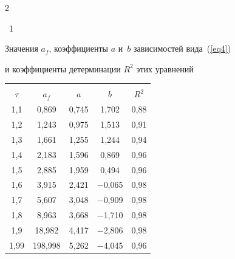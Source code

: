 \begin{multicols}{2}
\begin{center}
\vspace*{6pt}



\noindent

\parbox{64mm}{{{\tablename~1}\ \ \small{Значения $a_f$, коэффициенты $a$ и~$b$ зависимостей вида~(\ref{eq4})

и коэффициенты детерминации $R^2$ этих уравнений

}}}





\vspace*{6pt}





{\small 

\begin{tabular}{|c|c|c|c|c|}

\hline

&&&&\\[-10pt]

$\tau$ & $a_f$ & $a$ & $b$ & $R^2$ \\ 

\hline

1,1 & 0,869 &   0,745 & \hphantom{$-$}1,702 & 0,88 \\

1,2 & 1,243 &   0,975 & \hphantom{$-$}1,513 & 0,91 \\

1,3 & 1,661 &   1,255 & \hphantom{$-$}1,244 & 0,94 \\

1,4 & 2,183 &   1,596 & \hphantom{$-$}0,869 & 0,96 \\

1,5 & 2,885 &   1,959 & \hphantom{$-$}0,494 & 0,96 \\

1,6 & 3,915 &   2,421 & $-$0,065 & 0,98 \\

1,7 & 5,607 &   3,048 & $-$0,909 & 0,98 \\

1,8 & 8,963 &   3,668 & $-$1,710 & 0,98 \\

1,9 & 18,982\hphantom{9} & 4,417 & $-$2,806 & 0,98 \\

\hphantom{9}1,99 & 198,998\hphantom{99} & 5,262 & $-$4,045 & 0,96\\

\hline

\end{tabular}

}
\end{center}
\end{multicols}
